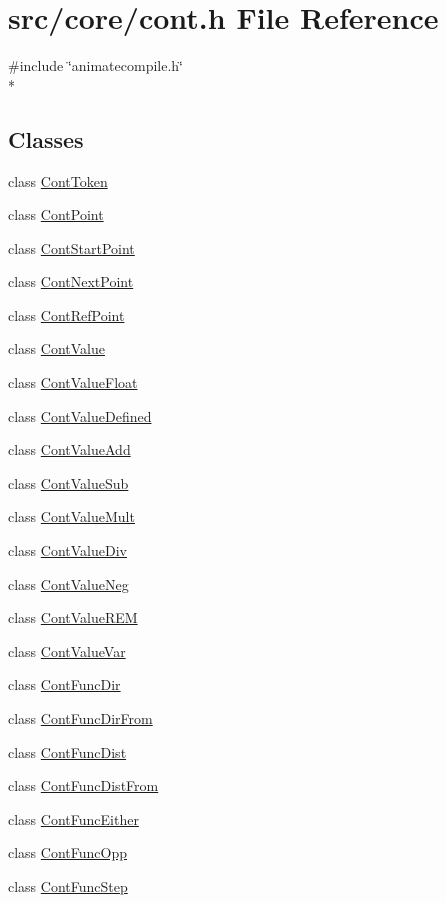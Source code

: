 \hypertarget{a00218}{\section{src/core/cont.h File Reference}
\label{a00218}
}
{\ttfamily \#include \char`\"{}animatecompile.\-h\char`\"{}}\\*
\subsection*{Classes}
\begin{DoxyCompactItemize}
\item 
class \hyperlink{a00085}{Cont\-Token}
\item 
class \hyperlink{a00062}{Cont\-Point}
\item 
class \hyperlink{a00084}{Cont\-Start\-Point}
\item 
class \hyperlink{a00061}{Cont\-Next\-Point}
\item 
class \hyperlink{a00083}{Cont\-Ref\-Point}
\item 
class \hyperlink{a00086}{Cont\-Value}
\item 
class \hyperlink{a00090}{Cont\-Value\-Float}
\item 
class \hyperlink{a00088}{Cont\-Value\-Defined}
\item 
class \hyperlink{a00087}{Cont\-Value\-Add}
\item 
class \hyperlink{a00094}{Cont\-Value\-Sub}
\item 
class \hyperlink{a00091}{Cont\-Value\-Mult}
\item 
class \hyperlink{a00089}{Cont\-Value\-Div}
\item 
class \hyperlink{a00092}{Cont\-Value\-Neg}
\item 
class \hyperlink{a00093}{Cont\-Value\-R\-E\-M}
\item 
class \hyperlink{a00095}{Cont\-Value\-Var}
\item 
class \hyperlink{a00052}{Cont\-Func\-Dir}
\item 
class \hyperlink{a00053}{Cont\-Func\-Dir\-From}
\item 
class \hyperlink{a00054}{Cont\-Func\-Dist}
\item 
class \hyperlink{a00055}{Cont\-Func\-Dist\-From}
\item 
class \hyperlink{a00056}{Cont\-Func\-Either}
\item 
class \hyperlink{a00057}{Cont\-Func\-Opp}
\item 
class \hyperlink{a00058}{Cont\-Func\-Step}

\end{DoxyCompactItemize}
